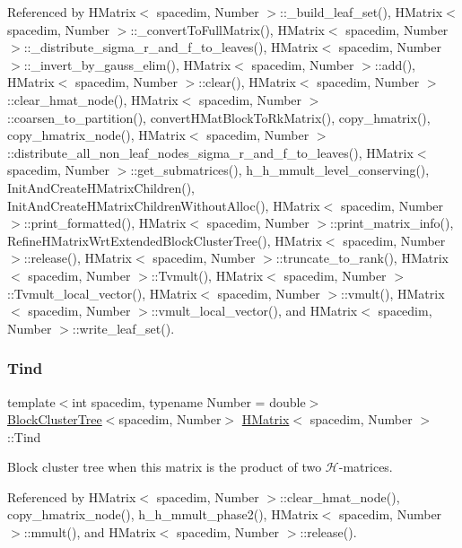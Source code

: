 Referenced by H\+Matrix$<$ spacedim, Number $>$\+::\+\_\+build\+\_\+leaf\+\_\+set(), H\+Matrix$<$ spacedim, Number $>$\+::\+\_\+convert\+To\+Full\+Matrix(), H\+Matrix$<$ spacedim, Number $>$\+::\+\_\+distribute\+\_\+sigma\+\_\+r\+\_\+and\+\_\+f\+\_\+to\+\_\+leaves(), H\+Matrix$<$ spacedim, Number $>$\+::\+\_\+invert\+\_\+by\+\_\+gauss\+\_\+elim(), H\+Matrix$<$ spacedim, Number $>$\+::add(), H\+Matrix$<$ spacedim, Number $>$\+::clear(), H\+Matrix$<$ spacedim, Number $>$\+::clear\+\_\+hmat\+\_\+node(), H\+Matrix$<$ spacedim, Number $>$\+::coarsen\+\_\+to\+\_\+partition(), convert\+H\+Mat\+Block\+To\+Rk\+Matrix(), copy\+\_\+hmatrix(), copy\+\_\+hmatrix\+\_\+node(), H\+Matrix$<$ spacedim, Number $>$\+::distribute\+\_\+all\+\_\+non\+\_\+leaf\+\_\+nodes\+\_\+sigma\+\_\+r\+\_\+and\+\_\+f\+\_\+to\+\_\+leaves(), H\+Matrix$<$ spacedim, Number $>$\+::get\+\_\+submatrices(), h\+\_\+h\+\_\+mmult\+\_\+level\+\_\+conserving(), Init\+And\+Create\+H\+Matrix\+Children(), Init\+And\+Create\+H\+Matrix\+Children\+Without\+Alloc(), H\+Matrix$<$ spacedim, Number $>$\+::print\+\_\+formatted(), H\+Matrix$<$ spacedim, Number $>$\+::print\+\_\+matrix\+\_\+info(), Refine\+H\+Matrix\+Wrt\+Extended\+Block\+Cluster\+Tree(), H\+Matrix$<$ spacedim, Number $>$\+::release(), H\+Matrix$<$ spacedim, Number $>$\+::truncate\+\_\+to\+\_\+rank(), H\+Matrix$<$ spacedim, Number $>$\+::\+Tvmult(), H\+Matrix$<$ spacedim, Number $>$\+::\+Tvmult\+\_\+local\+\_\+vector(), H\+Matrix$<$ spacedim, Number $>$\+::vmult(), H\+Matrix$<$ spacedim, Number $>$\+::vmult\+\_\+local\+\_\+vector(), and H\+Matrix$<$ spacedim, Number $>$\+::write\+\_\+leaf\+\_\+set().

\mbox{\label{classHMatrix_a12da9454687e5ca15837d63e2bf0b595}} 
\subsubsection{\texorpdfstring{Tind}{Tind}}
{\footnotesize\ttfamily template$<$int spacedim, typename Number = double$>$ \\
\hyperlink{classBlockClusterTree}{Block\+Cluster\+Tree}$<$spacedim, Number$>$ \hyperlink{classHMatrix}{H\+Matrix}$<$ spacedim, Number $>$\+::Tind\hspace{0.3cm}{\ttfamily [private]}}

Block cluster tree when this matrix is the product of two $\mathcal{H}$-\/matrices. 

Referenced by H\+Matrix$<$ spacedim, Number $>$\+::clear\+\_\+hmat\+\_\+node(), copy\+\_\+hmatrix\+\_\+node(), h\+\_\+h\+\_\+mmult\+\_\+phase2(), H\+Matrix$<$ spacedim, Number $>$\+::mmult(), and H\+Matrix$<$ spacedim, Number $>$\+::release().

